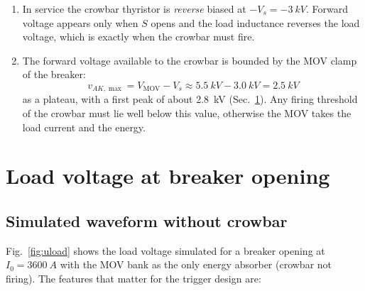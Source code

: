 \documentclass[11pt,a4paper]{article}
\begin{document}
\begin{enumerate}
\item In service the crowbar thyristor is \emph{reverse} biased at $-V_s = \SI{-3}{kV}$.
      Forward voltage appears only when $S$ opens and the load inductance reverses the load
      voltage, which is exactly when the crowbar must fire.
\item The forward voltage available to the crowbar is bounded by the MOV clamp of the breaker:
      \begin{equation}
        v_{AK,\max} = V_{\mathrm{MOV}} - V_s \approx \SI{5.5}{kV} - \SI{3.0}{kV} = \SI{2.5}{kV}
        \label{eq:vfw}
      \end{equation}
      as a plateau, with a first peak of about \SI{2.8}{kV} (Sec.~\ref{sec:uload}). Any firing
      threshold of the crowbar must lie well below this value, otherwise the MOV
      takes the load current and the energy.
\end{enumerate}

\section{Load voltage at breaker opening}
\label{sec:uload}

\subsection{Simulated waveform without crowbar}

Fig.~\ref{fig:uload} shows the load voltage simulated for a breaker opening at
$I_0 = \SI{3600}{A}$ with the MOV bank as the only energy absorber (crowbar not
firing). The features that matter for the trigger design are:
\end{document}
